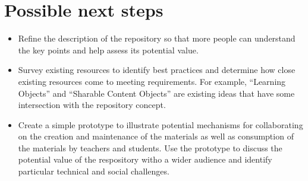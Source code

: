 \section*{Possible next steps}

\begin{itemize}

\item Refine the description of the repository so that more people can
understand the key points and help assess its potential value.
\item Survey existing resources to identify best practices and determine
how close existing resources come to meeting requirements.  For example,
``Learning Objects'' and ``Sharable Content Objects'' are existing ideas
that have some intersection with the repository concept.
\item Create a simple prototype to illustrate potential mechanisms for 
collaborating on the creation and maintenance of the materials as well as
consumption of the materials by teachers and students.  Use the prototype
to discuss the potential value of the respository witho a wider audience
and identify particular technical and social challenges.

\end{itemize}


